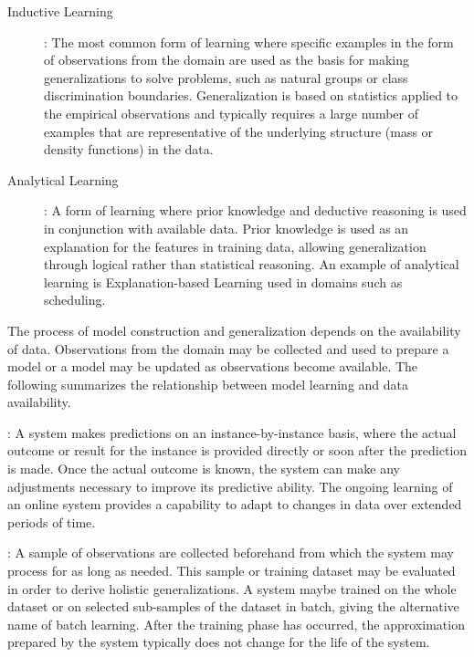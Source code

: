 \begin{description}
	\item[Inductive Learning]: The most common form of learning where specific examples in the form of observations from the domain are used as the basis for making generalizations to solve problems, such as natural groups or class discrimination boundaries. Generalization is based on statistics applied to the empirical observations and typically requires a large number of examples that are representative of the underlying structure (mass or density functions) in the data.
	
	\item[Analytical Learning]: A form of learning where prior knowledge and deductive reasoning is used in conjunction with available data. Prior knowledge is used as an explanation for the features in training data, allowing generalization through logical rather than statistical reasoning. An example of analytical learning is Explanation-based Learning used in domains such as scheduling.
	
\end{description}

The process of model construction and generalization depends on the availability of data. Observations from the domain may be collected and used to prepare a model or a model may be updated as observations become available. The following summarizes the relationship between model learning and data availability.

\begin{description}
	\item[Online Learning]: A system makes predictions on an instance-by-instance basis, where the actual outcome or result for the instance is provided directly or soon after the prediction is made. Once the actual outcome is known, the system can make any adjustments necessary to improve its predictive ability. The ongoing learning of an online system provides a capability to adapt to changes in data over extended periods of time.
	
	\item[Offline Learning]: A sample of observations are collected beforehand from which the system may process for as long as needed. This sample or training dataset may be evaluated in order to derive holistic generalizations. A system maybe trained on the whole dataset or on selected sub-samples of the dataset in batch, giving the alternative name of batch learning. After the training phase has occurred, the approximation prepared by the system typically does not change for the life of the system.

\end{description}



